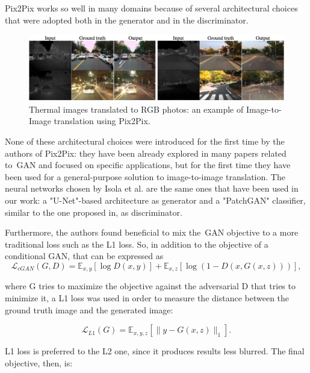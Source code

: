 \vspace{5mm} %
Pix2Pix works so well in many domains because of several architectural choices that were adopted both in the generator and in the discriminator.

\begin{figure}[htbp!]
\centering
\includegraphics[height=0.165\textheight]{images/pix2pix_2}
\caption[Samples from Pix2Pix, Isola et al.]{Thermal images translated to RGB photos: an example of Image-to-Image translation using Pix2Pix\cite{pix2pix}.}
\label{fig:pix2pix_2}
\end{figure}


None of these architectural choices were introduced for the first time by the authors of Pix2Pix: they have been already explored in many papers related to~\ac{GAN} and focused on specific applications, but for the first time they have been used for a general-purpose solution to image-to-image translation.
The neural networks chosen by Isola et al. are the same ones that have been used in our work: a "U-Net"-based architecture\cite{unet} as generator and a "PatchGAN" classifier, similar to the one proposed in\cite{patchgan}, as discriminator. 

Furthermore, the authors found beneficial to mix the~\ac{GAN} objective to a more traditional loss such as the L1 loss.
So, in addition to the objective of a conditional GAN, that can be expressed as
\begin{equation} \label{eq:objective_gan}
\mathcal{L}_{cGAN}(G,D) = \mathbb{E}_{x,y} [\log D(x, y)] + \mathbb{E}_{x,z} [\log (1 - D(x, G(x, z)))], 
\end{equation}

where G tries to maximize the objective against the adversarial D that tries to minimize it, a L1 loss was used in order to measure the distance between the ground truth image and the generated image:

\begin{equation} \label{eq:l1_loss}
\mathcal{L}_{L1}(G) = \mathbb{E}_{x,y,z} [\| y - G(x,z) \|_1].
\end{equation}

L1 loss is preferred to the L2 one, since it produces results less blurred. 
The final objective, then, is:

